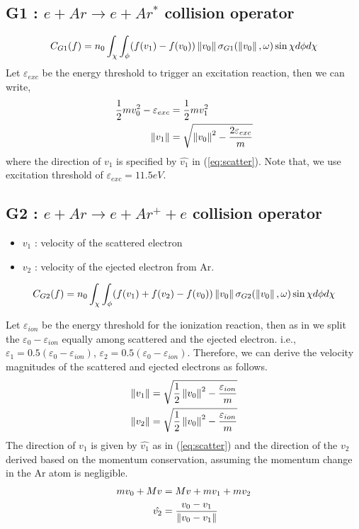 \documentclass{article}
\begin{document}
\subsection{G1 : $e + Ar \rightarrow e + Ar^*$ collision operator}
\begin{equation}
    C_{G1}(f) = n_0 \int_{\chi} \int_{\phi} (f(v_1) - f(v_0)) \left\lVert v_0\right\rVert \sigma_{G1}(\left\lVert v_0\right\rVert,\omega) \sin\chi d\phi d\chi
\end{equation}
Let $\varepsilon_{exc}$ be the energy threshold to trigger an excitation reaction, then we can write, 
\begin{align}
    \frac{1}{2} m v_0 ^2  - \varepsilon_{exc} &= \frac{1}{2} m v_1 ^2 \\
    \left\lVert v_1\right\rVert &= \sqrt{\left\lVert v_0\right\rVert^2 - \frac{2\varepsilon_{exc}}{m}}
\end{align} where the direction of $v_1$ is specified by $\hat{v_1}$ in (\ref{eq:scatter}). Note that, we use excitation threshold of $\varepsilon_{exc}=11.5eV$.

\subsection{G2 : $e + Ar \rightarrow e + Ar^+ + e$ collision operator}
\begin{itemize}
    \item $v_1$ : velocity of the scattered electron
    \item $v_2$ : velocity of the ejected electron from Ar. 
\end{itemize}
\begin{equation}
    C_{G2}(f) = n_0 \int_{\chi} \int_{\phi} (f(v_1) + f(v_2) - f(v_0)) \left\lVert v_0\right\rVert \sigma_{G2}(\left\lVert v_0\right\rVert,\omega) \sin\chi d\phi d\chi
\end{equation}

Let $\varepsilon_{ion}$ be the energy threshold for the ionization reaction, then as in \cite{vahedi1995monte} we split the $\varepsilon_0-\varepsilon_{ion}$ equally among scattered and the ejected electron. i.e., $\varepsilon_1 = 0.5 (\varepsilon_0-\varepsilon_{ion})$, $\varepsilon_2 = 0.5 (\varepsilon_0-\varepsilon_{ion})$. Therefore, we can derive the velocity magnitudes of the scattered and ejected electrons as follows. 
\begin{align}
    \left\lVert v_1\right\rVert &= \sqrt{\frac{1}{2}\left\lVert v_0\right\rVert^2 - \frac{\varepsilon_{ion}}{m}}\\
    \left\lVert v_2\right\rVert &= \sqrt{\frac{1}{2}\left\lVert v_0\right\rVert^2 - \frac{\varepsilon_{ion}}{m}}
\end{align}
The direction of $v_1$ is given by $\hat{v_1}$ as in (\ref{eq:scatter}) and the direction of the $v_2$ derived based on the momentum conservation, assuming the momentum change in the Ar atom is negligible. 
\begin{align}
    m v_0 + M v &= Mv + m v_1 + m v_2  \\
    \hat{v_2} &= \frac{v_0 - v_1}{\left\lVert v_0 - v_1\right\rVert}
\end{align}
\end{document}
